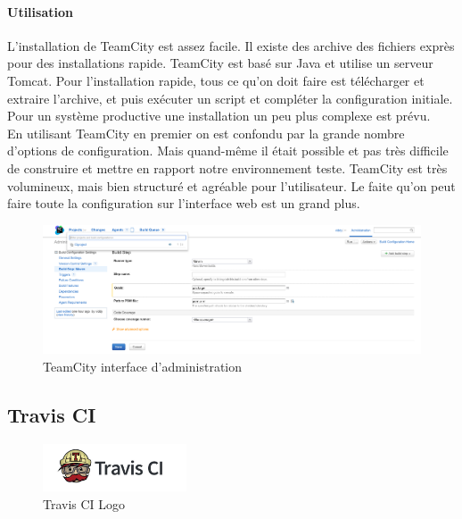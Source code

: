 \paragraph{Utilisation}
L'installation de TeamCity est assez facile. Il existe des archive des fichiers exprès pour des installations rapide. TeamCity est basé sur Java et utilise un serveur Tomcat. Pour l'installation rapide, tous ce qu'on doit faire est télécharger et extraire l'archive, et puis exécuter un script et compléter la configuration initiale. Pour un système productive une installation un peu plus complexe est prévu.\\
En utilisant TeamCity en premier on est confondu par la grande nombre d'options de configuration. Mais quand-même il était possible et pas très difficile de construire et mettre en rapport notre environnement teste. TeamCity est très volumineux, mais bien structuré et agréable pour l'utilisateur. Le faite qu'on peut faire toute la configuration sur l'interface web est un grand plus.
\begin{figure}[H]
	\centering
		\includegraphics[scale=0.35]{bilder/teamcityadmin}
	\caption{TeamCity interface d'administration}
	\label{fig:travisgui}
\end{figure}





\clearpage
\subsection{Travis CI}
\begin{figure}
  \begin{center}
    \includegraphics[width=0.38\textwidth]{bilder/Travis-CI-logo}
  \end{center}
  \caption{Travis CI Logo}
\end{figure}
